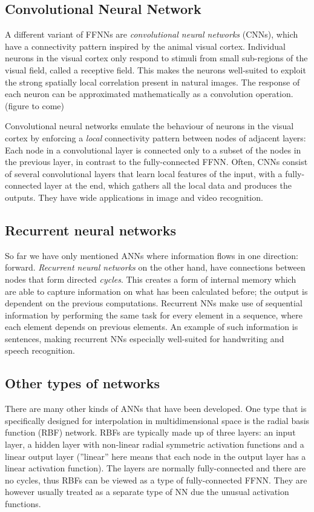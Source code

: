 \documentclass[%
oneside,                 %
final,                   %
10pt]{article}
\begin{document}
\subsection*{Convolutional Neural Network}

A different variant of FFNNs are \emph{convolutional neural networks}
(CNNs), which have a connectivity pattern inspired by the animal
visual cortex. Individual neurons in the visual cortex only respond to
stimuli from small sub-regions of the visual field, called a receptive
field. This makes the neurons well-suited to exploit the strong
spatially local correlation present in natural images. The response of
each neuron can be approximated mathematically as a convolution
operation.  (figure to come)

Convolutional neural networks emulate the behaviour of neurons in the
visual cortex by enforcing a \emph{local} connectivity pattern between
nodes of adjacent layers: Each node in a convolutional layer is
connected only to a subset of the nodes in the previous layer, in
contrast to the fully-connected FFNN.  Often, CNNs consist of several
convolutional layers that learn local features of the input, with a
fully-connected layer at the end, which gathers all the local data and
produces the outputs. They have wide applications in image and video
recognition.

\subsection*{Recurrent neural networks}

So far we have only mentioned ANNs where information flows in one
direction: forward. \emph{Recurrent neural networks} on the other hand,
have connections between nodes that form directed \emph{cycles}. This
creates a form of internal memory which are able to capture
information on what has been calculated before; the output is
dependent on the previous computations. Recurrent NNs make use of
sequential information by performing the same task for every element
in a sequence, where each element depends on previous elements. An
example of such information is sentences, making recurrent NNs
especially well-suited for handwriting and speech recognition.

\subsection*{Other types of networks}

There are many other kinds of ANNs that have been developed. One type
that is specifically designed for interpolation in multidimensional
space is the radial basis function (RBF) network. RBFs are typically
made up of three layers: an input layer, a hidden layer with
non-linear radial symmetric activation functions and a linear output
layer (''linear'' here means that each node in the output layer has a
linear activation function). The layers are normally fully-connected
and there are no cycles, thus RBFs can be viewed as a type of
fully-connected FFNN. They are however usually treated as a separate
type of NN due the unusual activation functions.
\end{document}
